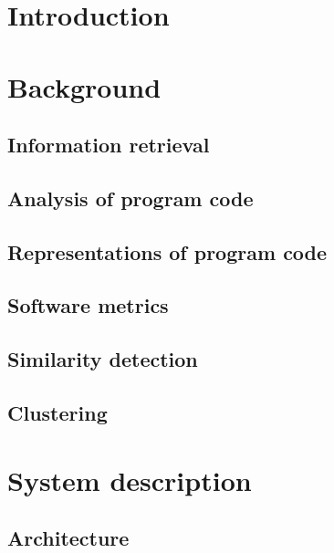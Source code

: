 \documentclass[english,twoside,openright]{HYgraduMLDS}
\begin{document}
\mynomenclature

\chapter{Introduction}
\label{ch:introduction}


\chapter{Background}
\label{ch:background}


\section{Information retrieval}
\label{sec:ir}


\section{Analysis of program code}
\label{sec:analyzing-code}


\section{Representations of program code}
\label{sec:representations}


\section{Software metrics}
\label{sec:metrics}


\section{Similarity detection}
\label{sec:sim-detection}


\section{Clustering}
\label{sec:clustering}


\chapter{System description}
\label{ch:system-description}


\section{Architecture}
\label{sec:architecture}

\end{document}
